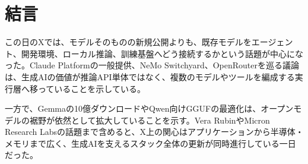 \section*{結言}
この日のXでは、モデルそのものの新規公開よりも、既存モデルをエージェント、開発環境、ローカル推論、訓練基盤へどう接続するかという話題が中心になった。Claude Platformの一般提供、NeMo Switchyard、OpenRouterを巡る議論は、生成AIの価値が推論API単体ではなく、複数のモデルやツールを編成する実行層へ移っていることを示している。

一方で、Gemmaの10億ダウンロードやQwen向けGGUFの最適化は、オープンモデルの裾野が依然として拡大していることを示す。Vera RubinやMicron Research Labsの話題まで含めると、X上の関心はアプリケーションから半導体・メモリまで広く、生成AIを支えるスタック全体の更新が同時進行している一日だった。
